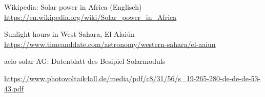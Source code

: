 \begin{thebibliography}{99}
    Wikipedia: Solar power in Africa (Englisch)\\
    \href{https://en.wikipedia.org/wiki/Solar_power_in_Africa}{
        https://en.wikipedia.org/wiki/Solar\_power\_in\_Africa
    }

    Sunlight hours in West Sahara, El Alaiún\\
    \href{https://www.timeanddate.com/astronomy/western-sahara/el-aaiun}{
        https://www.timeanddate.com/astronomy/western-sahara/el-aaiun
    }

    \begin{flushleft}
        aelo solar AG: Datenblatt des Besipiel Solarmoduls
    \end{flushleft}
    \href{https://www.photovoltaik4all.de/media/pdf/c8/31/56/s_19-265-280-de-de-de-53-43.pdf}{
        https://www.photovoltaik4all.de/media/pdf/c8/31/56/s\_19-265-280-de-de-de-53-43.pdf
    }
\end{thebibliography}